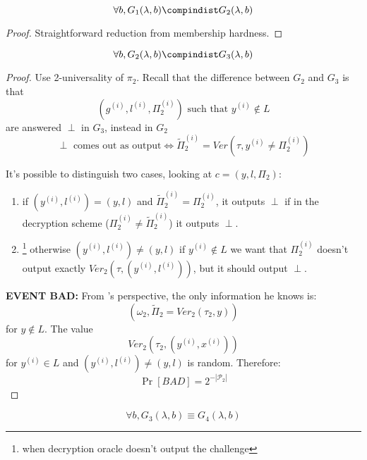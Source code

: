 \begin{lemma}
    \[
        \forall b, G_{1}(\lambda, b) \compindist G_{2}(\lambda, b)   
    \]
\end{lemma}
\begin{proof}
    Straightforward reduction from membership hardness.

\end{proof}

\begin{lemma}
    \[
        \forall b, G_{2}(\lambda , b) \compindist G_{3}(\lambda, b)
    \]
\end{lemma}
\begin{proof}
    Use 2-universality of $\pi_2$. Recall that the difference between $G_{2}$ and $G_{3}$ is that 
    \[
        (g^{(i)}, l^{(i)}, \Pi_{2}^{(i)})\text{ such that }y^{(i)}\not\in L 
    \]
    are answered $\perp$ in $G_{3}$, instead in $G_{2}$
    \[
        \perp \text{ comes out as output} \Leftrightarrow
        \tilde{\Pi}^{(i)}_{2}=Ver(\tau, y^{(i)}\not=\Pi^{(i)}_{2})
    \]

    It's possible to distinguish two cases, looking at $c = (y, l, \Pi_2)$:
\begin{enumerate}
    \item if $(y^{(i)}, l^{(i)})=(y,l)$ and $\tilde{\Pi}^{(i)}_{2}=\Pi^{(i)}_{2}$, it outputs $\perp$ if in the decryption scheme ($\Pi^{(i)}_{2} \not= \tilde{\Pi}^{(i)}_{2}$) it outputs $\perp$.

    \item \footnote{when decryption oracle doesn't output the challenge} otherwise $(y^{(i)}, l^{(i)})\not= (y,l)$ if $y^{(i)}\not\in L$ we want that $\Pi^{(i)}_{2}$ doesn't output exactly $Ver_{2}(\tau, (y^{(i)}, l^{(i)}))$, but it should output $\perp$.
\end{enumerate}

\textbf{EVENT BAD:} From \adversary{}'s perspective, the only information he knows is:
\[
    (\omega_{2}, \tilde{\Pi}_{2}=Ver_{2}(\tau_{2}, y))
\]
for $y \not\in L$. The value 
\[
    Ver_{2}(\tau_{2}, (y^{(i)}, x^{(i)}))
\]
for $y^{(i)} \in L$ and $(y^{(i)}, l^{(i)}) \neq (y, l)$ is random. Therefore: 
\[
    \Pr[BAD] = 2^{-|\mathcal{P}_{2}|} 
\]

\end{proof}

\begin{lemma}
    \[
        \forall b , G_{3}(\lambda, b)\equiv G_{4}(\lambda, b)   
    \]
\end{lemma}


